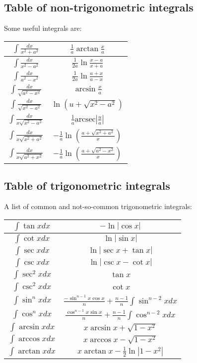 \subsection{Table of non-trigonometric integrals}
      Some useful integrals are:
      
      \begin{tabular}{|c|c|}
        \hline
        $\int \frac{dx}{x^2 + a^2}$ & $\frac{1}{a} \arctan \frac{x}{a}$ \\ \hline
        $\int \frac{dx}{x^2 - a^2}$ & $\frac{1}{2a} \ln \frac{x - a}{x + a}$ \\ \hline
        $\int \frac{dx}{a^2 - x^2}$ & $\frac{1}{2a} \ln \frac{a + x}{a - x}$ \\ \hline
        $\int \frac{dx}{\sqrt{a^2 - x^2}}$ & $\arcsin \frac{x}{a}$ \\ \hline
        $\int \frac{dx}{\sqrt{x^2 - a^2}}$ & $\ln \left(u + \sqrt{x^2 - a^2}\right)$ \\ \hline
        $\int \frac{dx}{x \sqrt{x^2 - a^2}}$ & $\frac{1}{a} \text{arcsec} \left| \frac{u}{a} \right|$ \\ \hline
        $\int \frac{dx}{x \sqrt{x^2 + a^2}}$ & $-\frac{1}{a} \ln \left( \frac{a + \sqrt{x^2 + a^2}}{x} \right)$ \\ \hline
        $\int \frac{dx}{x \sqrt{a^2 + x^2}}$ & $-\frac{1}{a} \ln \left( \frac{a + \sqrt{a^2 - x^2}}{x} \right)$ \\ \hline
      \end{tabular}


\subsection{Table of trigonometric integrals}
      A list of common and not-so-common trigonometric integrals:

      \begin{tabular}{|c|c|}
        \hline
        $\int \tan x dx$ & $-\ln |\cos x|$ \\ \hline
        $\int \cot x dx$ & $\ln |\sin x|$ \\ \hline
        $\int \sec x dx$ & $\ln |\sec x + \tan x|$ \\ \hline
        $\int \csc x dx$ & $\ln |\csc x - \cot x|$ \\ \hline
        $\int \sec^2 x dx$ & $\tan x$ \\ \hline
        $\int \csc^2 x dx$ & $\cot x$ \\ \hline
        $\int \sin^n x dx$ & $\frac{-\sin^{n-1} x \cos x}{n} + \frac{n-1}{n}\int \sin^{n-2}x dx$ \\ \hline
        $\int \cos^n x dx$ & $\frac{\cos^{n-1} x \sin x}{n} + \frac{n-1}{n}\int \cos^{n-2}x dx$ \\ \hline
        $\int \arcsin x dx$ & $x \arcsin x + \sqrt{1 - x^2}$ \\ \hline
        $\int \arccos x dx$ & $x \arccos x - \sqrt{1 - x^2}$ \\ \hline
        $\int \arctan x dx$ & $x \arctan x - \frac{1}{2} \ln |1 - x^2|$ \\ \hline
      \end{tabular}


